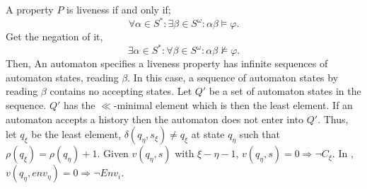 \documentclass[12pt,a4paper,titlepage]{article}
\theoremstyle{break}
\begin{document}
A property $P$ is liveness if and only if;
  \begin{displaymath}
\forall\alpha\in S^{*}\colon\exists\beta\in S^{\omega}\colon\alpha\beta\models\varphi.
  \end{displaymath}
Get the negation of it,
  \begin{displaymath}
\exists\alpha\in S^{*}\colon\forall\beta\in S^{\omega}\colon\alpha\beta\not\models\varphi.
  \end{displaymath}
Then, An automaton specifies a liveness property has infinite sequences of automaton states, reading \(\beta\).
In this case, a sequence of automaton states by reading \(\beta\) contains no accepting states.
Let \(Q'\) be a set of automaton states in the sequence.
\(Q'\) has the \(\ll\)-minimal element which is then the least element.
If an automaton accepts a history then the automaton does not enter into \(Q'\).
Thus, let \(q_{\xi}\) be the least element, \(\delta(q_{\eta},s_{\xi})\neq q_{\xi}\) at state \(q_{\eta}\) such that \(\rho(q_{\xi})=\rho(q_{\eta})+1\).
Given \(v(q_{\eta},s)\) with \(\xi-\eta-1\), \(v(q_{\eta},s)=0\Rightarrow\neg C_{\xi}\).
In \NHK, \(v(q_{\eta},env_{\eta})=0\Rightarrow\neg Env_i\).
\end{document}
